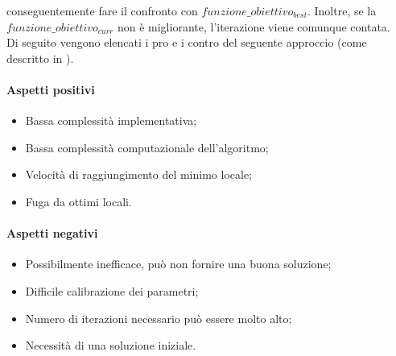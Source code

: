 conseguentemente fare il confronto con {$funzione\_obiettivo_{best}$}. Inoltre, se la {$funzione\_obiettivo_{curr}$} non è migliorante, l'iterazione
viene comunque contata.\\
Di seguito vengono elencati i pro e i contro del seguente approccio (come descritto in \cite{siteQ:paper-lo-go} \cite{siteT:articolo-tabu-search}).\\
\noindent \paragraph{Aspetti positivi}
\begin{itemize}
    \item Bassa complessità implementativa;
    \item Bassa complessità computazionale dell'algoritmo;
    \item Velocità di raggiungimento del minimo locale;
    \item Fuga da ottimi locali.
\end{itemize}

\noindent \paragraph{Aspetti negativi}
\begin{itemize}
    \item Possibilmente inefficace, può non fornire una buona soluzione;
    \item Difficile calibrazione dei parametri;
    \item Numero di iterazioni necessario può essere molto alto;
    \item Necessità di una soluzione iniziale.
\end{itemize}
